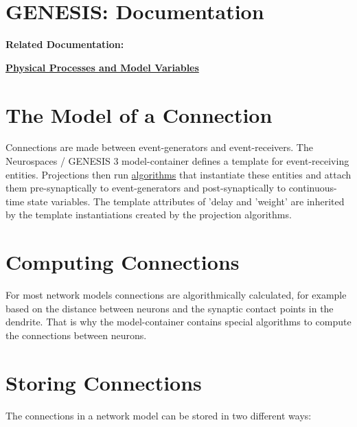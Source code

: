 \documentclass[12pt]{article}
\begin{document}
\section*{GENESIS: Documentation}

{\bf Related Documentation:}

\href{../ndf-variables/ndf-variables.tex}{\bf Physical Processes and Model Variables}


\section*{The Model of a Connection}

Connections are made between event-generators and event-receivers.
The Neurospaces / GENESIS 3 model-container defines a template for
event-receiving entities.  Projections then run
\href{../ndf-procedural-description/ndf-procedural-description.tex}{algorithms}
that instantiate these entities and attach them pre-synaptically to
event-generators and post-synaptically to continuous-time state
variables.  The template attributes of 'delay and 'weight' are
inherited by the template instantiations created by the projection
algorithms.



\section*{Computing Connections}

For most network models connections are algorithmically calculated,
for example based on the distance between neurons and the synaptic
contact points in the dendrite.  That is why the model-container
contains special {algorithms} to compute the connections between
neurons.

\section*{Storing Connections}

The connections in a network model can be stored in two different ways:
\end{document}
